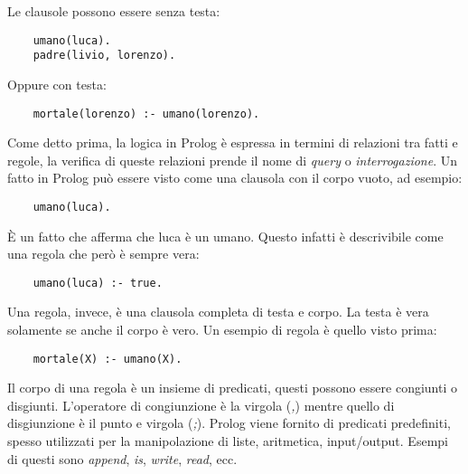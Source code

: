 Le clausole possono essere senza testa:
\begin{verbatim}
    umano(luca).
    padre(livio, lorenzo).
\end{verbatim}
Oppure con testa:
\begin{verbatim}
    mortale(lorenzo) :- umano(lorenzo).
\end{verbatim}

Come detto prima, la logica in Prolog è espressa in termini di relazioni tra fatti e regole, la verifica di queste relazioni
prende il nome di \textit{query} o \textit{interrogazione}.  
Un fatto in Prolog può essere visto come una clausola con il corpo vuoto, ad esempio:
\begin{verbatim}
    umano(luca).
\end{verbatim}
È un fatto che afferma che luca è un umano. Questo infatti è descrivibile come una regola che però è sempre vera:
\begin{verbatim}
    umano(luca) :- true.
\end{verbatim}
Una regola, invece, è una clausola completa di testa e corpo. La testa è vera solamente se anche il corpo è vero.
Un esempio di regola è quello visto prima:
\begin{verbatim}
    mortale(X) :- umano(X).
\end{verbatim}

Il corpo di una regola è un insieme di predicati, questi possono essere congiunti o disgiunti. L'operatore di congiunzione è la
virgola (\textit{,}) mentre quello di disgiunzione è il punto e virgola (\textit{;}). Prolog viene fornito di predicati predefiniti, spesso 
utilizzati per la manipolazione di liste, aritmetica, input/output. Esempi di questi sono \textit{append}, \textit{is}, \textit{write}, \textit{read}, ecc.

